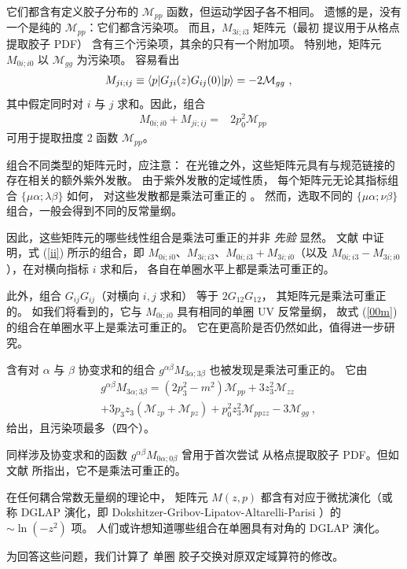 它们都含有定义胶子分布的 $\mathcal{M}_{pp}$ 函数，但运动学因子各不相同。
遗憾的是，没有一个是纯的 $\mathcal{M}_{pp}$：它们都含污染项。
而且，${ M}_{3 i; i 3}$ 矩阵元（最初 \cite{Ji:2013dva}
提议用于从格点提取胶子 PDF）
含有三个污染项，其余的只有一个附加项。
特别地，矩阵元 ${ M}_{0 i; i 0}$ 以 $\mathcal{M}_{gg}$ 为污染项。
容易看出
\begin{align}
{ M}_{j i ; ij} \equiv \langle p\rvert G_{j i} (z) G_{ij}(0) \lvert p\rangle &= -2 \mathcal{M}_{gg} \ ,
\end{align}
其中假定同时对 $i$ 与 $j$ 求和。因此，组合
\begin{align}
{ M}_{0 i; i 0} + { M}_{j i ; i j } = & 2 p_0^2 \mathcal{M}_{pp} \
\label{00m}
\end{align}
可用于提取扭度 2 函数 $\mathcal{M}_{pp}$。

组合不同类型的矩阵元时，应注意：
在光锥之外，这些矩阵元具有与规范链接的存在相关的额外紫外发散。
由于紫外发散的定域性质，
每个矩阵元无论其指标组合 $\{\mu \alpha; \lambda \beta\}$ 如何，
对这些发散都是乘法可重正的 \cite{Li:2018tpe}。
然而，选取不同的 $\{\mu \alpha; \nu \beta\}$ 组合，一般会得到不同的反常量纲。

因此，这些矩阵元的哪些线性组合是乘法可重正的并非 {\it 先验} 显然。
文献 \cite{Zhang:2018diq} 中证明，式 (\ref{ii}) 所示的组合，即
${ M}_{0 i; i 0}$、${ M}_{3 i; i 3}$、\mbox{${ M}_{0 i; i3} +
{ M}_{3 i; i 0}$}（以及 \mbox{${ M}_{0 i; i 3} -
{ M}_{3 i; i 0}$}），在对横向指标 $i$ 求和后，
各自在单圈水平上都是乘法可重正的。

此外，组合 $G_{ij}G_{ij}$（对横向 $i,j$ 求和）
等于 $2G_{12} G_{12}$，
其矩阵元是乘法可重正的。
如我们将看到的，它与 ${M}_{0 i; i 0}$ 具有相同的单圈 UV 反常量纲，
故式 (\ref{00m}) 的组合在单圈水平上是乘法可重正的。
它在更高阶是否仍然如此，值得进一步研究。

含有对 $\alpha$ 与 $\beta$ 协变求和的组合 $g^{\alpha \beta} { M}_{3 \alpha; 3 \beta}$
也被发现是乘法可重正的。
它由
\begin{align}
& g^{\alpha \beta} { M}_{3 \alpha; 3 \beta } =
\left(2p_3^2 - m^2 \right) \mathcal{M}_{pp} + 3z_3^2 \mathcal{M}_{zz}
\nonumber \\ & + 3 p_3 z_3 \left( \mathcal{M}_{zp}+ \mathcal{M}_{pz} \right) + p_0^2 z_3^2 \mathcal{M}_{ppzz}
-3\mathcal{M}_{gg} \ ,
\end{align}
给出，且污染项最多（四个）。

同样涉及协变求和的函数 $g^{\alpha \beta} { M}_{0 \alpha; 0 \beta}$
曾用于首次尝试 \cite{Fan:2018dxu}
从格点提取胶子 PDF。但如文献
\cite{Zhang:2018diq} 所指出，它不是乘法可重正的。

在任何耦合常数无量纲的理论中，
矩阵元 ${ M}(z,p)$ 都含有对应于微扰演化（或称 DGLAP 演化，即 Dokshitzer-Gribov-Lipatov-Altarelli-Parisi
\cite{Gribov:1972ri,Altarelli:1977zs,Dokshitzer:1977sg}）的 \mbox{$\sim \ln (-z^2)$} 项。
人们或许想知道哪些组合在单圈具有对角的 DGLAP 演化。

为回答这些问题，我们计算了
单圈
胶子交换对原双定域算符的修改。

